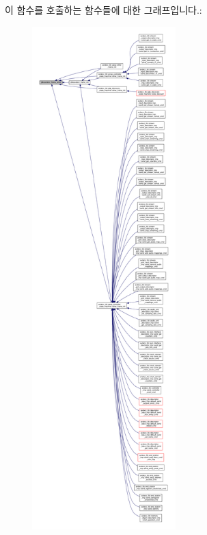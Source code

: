 이 함수를 호출하는 함수들에 대한 그래프입니다.\+:
\nopagebreak
\begin{figure}[H]
\begin{center}
\leavevmode
\includegraphics[height=550pt]{group__frame_gaba1e860c060886e82198907b17214aee_icgraph}
\end{center}
\end{figure}



